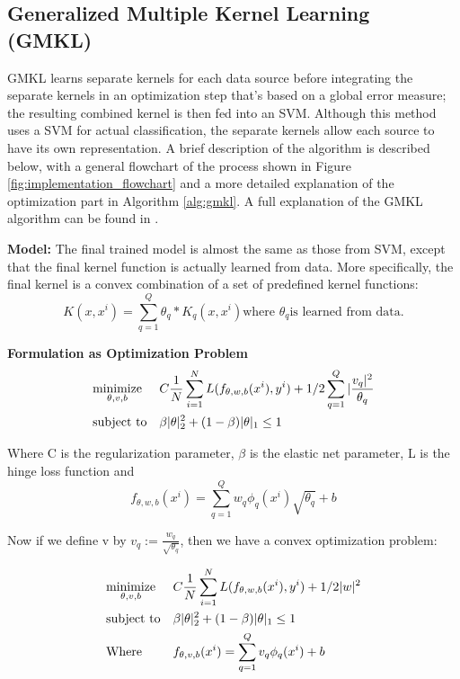 \documentclass{article}
\begin{document}
\subsection*{Generalized Multiple Kernel Learning (GMKL)}
GMKL learns separate kernels for each data source before integrating the
separate kernels in an optimization step that's based on a global error
measure; the resulting combined kernel is then fed into an SVM. Although this
method uses a SVM for actual classification, the separate kernels allow each
source to have its own representation. A brief description of the algorithm is
described below, with a general flowchart of the process shown in Figure
\ref{fig:implementation_flowchart} and a more detailed explanation of the
optimization part in Algorithm \ref{alg:gmkl}. A full explanation of the GMKL
algorithm can be found in \cite{gmkl}.

\textbf{Model:}
The final trained model is almost the same as those from SVM, except that the
final kernel function is actually learned from data. More specifically, the
final kernel is a convex combination of a set of predefined kernel functions:
$$K(x, x^i) = \sum_{q=1}^{Q} \theta_q * K_q(x, x^i) \text{where }\theta_q
\text{is learned from data}.$$

\textbf{Formulation as Optimization Problem}
\begin{align*}
&\text{$\underset{\theta, v, b}{\text{minimize}}$} & &C  \frac{1}{N} \sum_{i=1}^{N} L(f_{\theta, w, b}(x^i), y^i) + 1/2 \sum_{q=1}^{Q}|\frac{v_q|^2}{\theta_q} \\
&\text{subject to} & &\beta|\theta|_2^2 + (1-\beta){|\theta|_1} \leq 1
\end{align*}


Where C is the regularization parameter, $\beta$ is the elastic net parameter,
L is the hinge loss function and $$f_{\theta, w, b}(x^i) = \sum_{q=1}^{Q} w_q
\phi_q(x^i) \sqrt{\theta_q} + b $$

Now if we define v by $v_q := \frac{w_q}{\sqrt{\theta_q}}$, then we have a
convex optimization problem:

\begin{align*}
&\text{$\underset{\theta, v, b}{\text{minimize}}$} & &C  \frac{1}{N} \sum_{i=1}^{N} L(f_{\theta, w, b}(x^i), y^i) + 1/2 |w|^2 \\
&\text{subject to} & &\beta|\theta|_2^2 + (1-\beta){|\theta|_1} \leq 1 \\
&\text{Where}  & &f_{\theta, v, b}(x^i) = \sum_{q=1}^{Q} v_q \phi_q(x^i)  + b
\end{align*}
\end{document}
